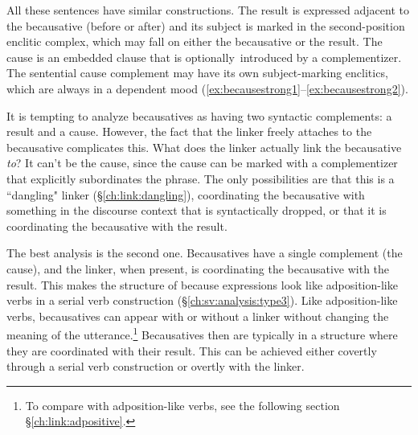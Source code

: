 All these sentences have similar constructions. The result is expressed adjacent to the becausative (before or after) and its subject is marked in the second-position enclitic complex, which may fall on either the becausative or the result. The cause is an embedded clause that is optionally introduced by a complementizer. The sentential cause complement may have its own subject-marking enclitics, which are always in a dependent mood (\ref{ex:becausestrong1}--\ref{ex:becausestrong2}).

It is tempting to analyze becausatives as having two syntactic complements: a result and a cause. However, the fact that the linker freely attaches to the becausative complicates this. What does the linker actually link the becausative \textit{to}? It can't be the cause, since the cause can be marked with a complementizer that explicitly subordinates the phrase. The only possibilities are that this is a ``dangling" linker (\S\ref{ch:link:dangling}), coordinating the becausative with something in the discourse context that is syntactically dropped, or that it is coordinating the becausative with the result.

The best analysis is the second one. Becausatives have a single complement (the cause), and the linker, when present, is coordinating the becausative with the result. This makes the structure of because expressions look like adposition-like verbs in a serial verb construction (\S\ref{ch:sv:analysis:type3}). Like adposition-like verbs, becausatives can appear with or without a linker without changing the meaning of the utterance.\footnote{To compare with adposition-like verbs, see the following section \S\ref{ch:link:adpositive}.} Becausatives then are typically in a structure where they are coordinated with their result. This can be achieved either covertly through a serial verb construction or overtly with the linker.


